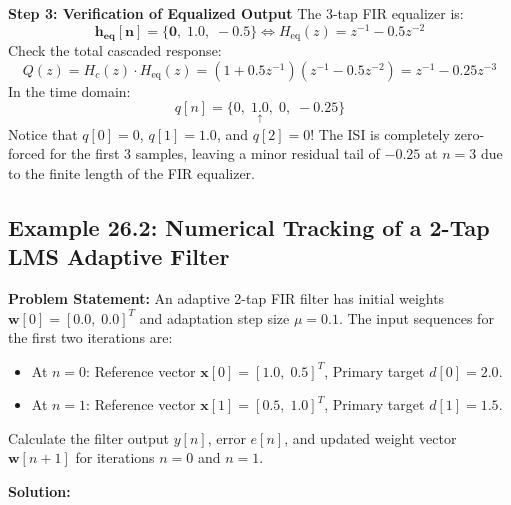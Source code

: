 \documentclass[11pt,a4paper]{article}
\begin{document}
\noindent\textbf{Step 3: Verification of Equalized Output}
The 3-tap FIR equalizer is:
\begin{equation}
\mathbf{h_{\text{eq}}[n] = \{0, \; 1.0, \; -0.5\}} \iff H_{\text{eq}}(z) = z^{-1} - 0.5 z^{-2}
\end{equation}
Check the total cascaded response:
\begin{equation}
Q(z) = H_c(z) \cdot H_{\text{eq}}(z) = (1 + 0.5 z^{-1})(z^{-1} - 0.5 z^{-2}) = z^{-1} - 0.25 z^{-3}
\end{equation}
In the time domain:
\begin{equation}
q[n] = \{0, \; \underset{\uparrow}{1.0}, \; 0, \; -0.25\}
\end{equation}
Notice that $q[0] = 0$, $q[1] = 1.0$, and $q[2] = 0$! The ISI is completely zero-forced for the first 3 samples, leaving a minor residual tail of $-0.25$ at $n=3$ due to the finite length of the FIR equalizer.

\vspace{2mm}
\subsection{Example 26.2: Numerical Tracking of a 2-Tap LMS Adaptive Filter}
\textbf{Problem Statement:} An adaptive 2-tap FIR filter has initial weights $\mathbf{w}[0] = [0.0, \; 0.0]^T$ and adaptation step size $\mu = 0.1$. The input sequences for the first two iterations are:
\begin{itemize}
    \item At $n = 0$: Reference vector $\mathbf{x}[0] = [1.0, \; 0.5]^T$, Primary target $d[0] = 2.0$.
    \item At $n = 1$: Reference vector $\mathbf{x}[1] = [0.5, \; 1.0]^T$, Primary target $d[1] = 1.5$.
\end{itemize}
Calculate the filter output $y[n]$, error $e[n]$, and updated weight vector $\mathbf{w}[n+1]$ for iterations $n = 0$ and $n = 1$.

\vspace{1mm}
\noindent\textbf{Solution:}
\end{document}

